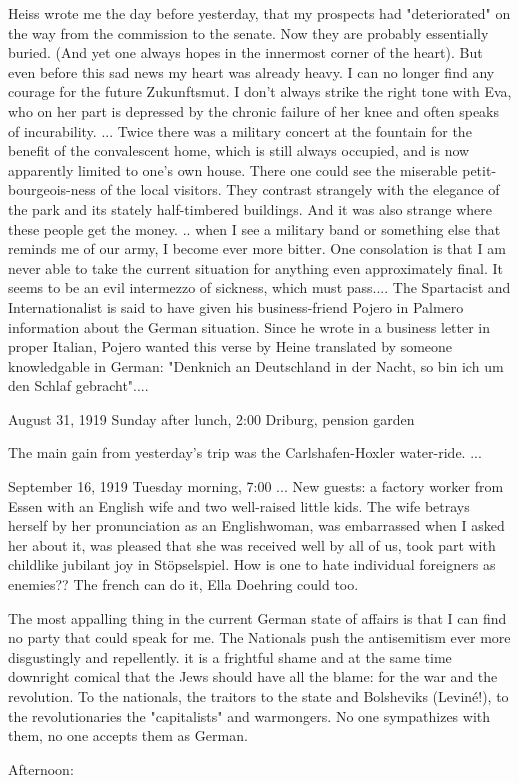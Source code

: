 Heiss wrote me the day before yesterday, that my prospects had "deteriorated" on the way from the commission to the senate. Now they are probably essentially buried. (And yet one always hopes in the innermost corner of the heart). But even before this sad news my heart was already heavy. I can no longer find any courage for the future {Zukunftsmut}. I don't always strike the right tone with Eva, who on her part is depressed by the chronic failure of her knee and often speaks of incurability.
{...}
Twice there was a military concert at the fountain for the benefit of the convalescent home, which is still always occupied, and is now apparently limited to one's own house. There one could see the miserable petit-bourgeois-ness of the local visitors. They contrast strangely with the elegance of the park and its stately half-timbered buildings. And it was also strange where these people get the money. {..} when I see a military band or something else that reminds me of our army, I become ever more bitter. One consolation is that I am never able to take the current situation for anything even approximately final. It seems to be an evil intermezzo of sickness, which must pass.... The Spartacist and Internationalist is said to have given his business-friend Pojero in Palmero information about the German situation. Since he wrote in a business letter in proper Italian, Pojero wanted this verse by Heine translated by someone knowledgable in German: "Denknich an Deutschland in der Nacht, so bin ich um den Schlaf gebracht"....

August 31, 1919
Sunday after lunch, 2:00
Driburg, pension garden

The main gain from yesterday's trip was the Carlshafen-Hoxler water-ride. 
{...}

September 16, 1919
Tuesday morning, 7:00
{...}
New guests: a factory worker from Essen with an English wife and two well-raised little kids. The wife betrays herself by her pronunciation as an Englishwoman, was embarrassed when I asked her about it, was pleased that she was received well by all of us, took part with childlike jubilant joy in Stöpselspiel.  How is one to hate individual foreigners as enemies?? The french can do it, Ella Doehring could too.

The most appalling thing in the current German state of affairs is that I can find no party that could speak for me. The Nationals push the antisemitism ever more disgustingly and repellently. it is a frightful shame and at the same time downright comical that the Jews should have all the blame: for the war and the revolution. To the nationals, the traitors to the state and Bolsheviks (Leviné!), to the revolutionaries the "capitalists" and warmongers. No one sympathizes with them, no one accepts them as German.

Afternoon: 
